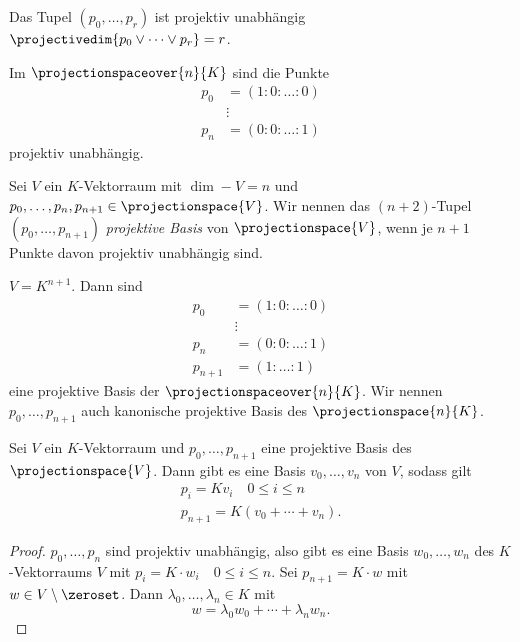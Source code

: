 \begin{bemerkungen*}
  Das Tupel \( (p_0,\dotsc,p_r) \) ist projektiv unabhängig \gdw \( \projectivedim{p_0\vee \dotsb\vee p_r}=r \).
\end{bemerkungen*}
\begin{beispiel*}
  Im \( \projectionspaceover{n}{K} \) sind die Punkte
  \begin{align*}
    p_0&=(1:0:\dotsc:0)\\
    &\vdots\\
    p_n&=(0:0:\dotsc:1)
  \end{align*}
  projektiv unabhängig.
\end{beispiel*}
\begin{definition*}
  Sei \( V \) ein \( K \)-Vektorraum mit \( \dim-{V}=n \) und \( p_0,\dotsc,p_n,p_{n+1}\in \projectionspace{V} \). Wir nennen das \( (n+2) \)-Tupel \( (p_0,\dotsc,p_{n+1}) \) \emph{projektive Basis} von \( \projectionspace{V} \), wenn je \( n+1 \) Punkte davon projektiv unabhängig sind.
\end{definition*}
\begin{beispiel*}
  \( V=K^{n+1} \). Dann sind
  \begin{align*}
    p_0&=(1:0:\dotsc:0)\\
    &\vdots\\
    p_n&=(0:0:\dotsc:1)\\
    p_{n+1}&=(1:\dotsc:1)
  \end{align*}
  eine projektive Basis der \( \projectionspaceover{n}{K} \). Wir nennen \( p_0,\dotsc,p_{n+1}  \) auch kanonische projektive Basis des \( \projectionspace{n}{K} \).
\end{beispiel*}
\begin{lemma}\label{kanonische_projektive_basis_klappt}
  Sei \( V \) ein \( K \)-Vektorraum und \( p_0,\dotsc,p_{n+1} \) eine projektive Basis des \( \projectionspace{V} \). Dann gibt es eine Basis \( v_0,\dots,v_n \) von \( V \), sodass gilt
  \begin{gather*}
    p_i=Kv_i\quad 0\leq i\leq n\\
    p_{n+1}=K(v_0+\dotsb+v_n).
  \end{gather*}
\end{lemma}
\begin{proof}
  \( p_0,\dotsc,p_n \) sind projektiv unabhängig, also gibt es eine Basis \( w_0,\dotsc,w_n \) des \( K \)-Vektorraums \( V \) mit \( p_i=K\cdot w_i \quad 0\leq i\leq n\). Sei \( p_{n+1}=K\cdot w \) mit \( w\in V\setminus\zeroset \). Dann \texists \( \lambda_0,\dotsc,\lambda_n\in K \) mit 
  \begin{equation*}
    w=\lambda_0 w_0+\dotsb+\lambda_n w_n.
  \end{equation*}
\end{proof}
